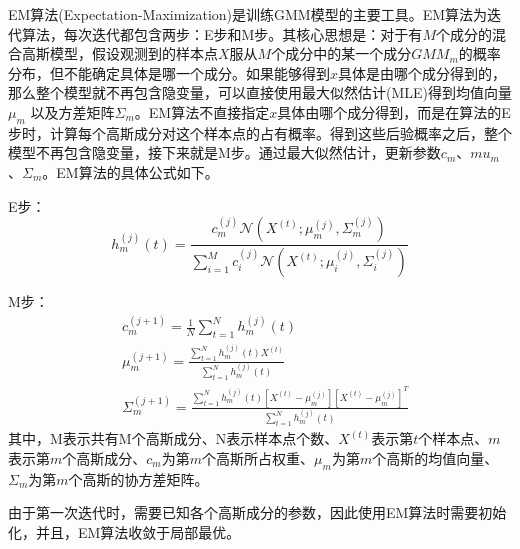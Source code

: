 EM算法(Expectation-Maximization)是训练GMM模型的主要工具。EM算法为迭代算法，每次迭代都包含两步：E步和M步。其核心思想是：对于有$M$个成分的混合高斯模型，假设观测到的样本点$X$服从$M$个成分中的某一个成分$GMM_m$的概率分布，但不能确定具体是哪一个成分。如果能够得到$x$具体是由哪个成分得到的，那么整个模型就不再包含隐变量，可以直接使用最大似然估计(MLE)得到均值向量$\mu_m$ 以及方差矩阵$\Sigma_m$。EM算法不直接指定$x$具体由哪个成分得到，而是在算法的E步时，计算每个高斯成分对这个样本点的占有概率。得到这些后验概率之后，整个模型不再包含隐变量，接下来就是M步。通过最大似然估计，更新参数$c_m$、$mu_m$、$\Sigma_m$。EM算法的具体公式如下。

E步：
\begin{equation}
  h_m^{(j)}(t) = \frac{c_m^{(j)}\mathcal{N}(X^{(t)};\mu_m^{(j)},\Sigma_m^{(j)})}{\sum_{i=1}^M c_i^{(j)}\mathcal{N}(X^{(t)};\mu_i^{(j)},\Sigma_i^{(j)})}
\end{equation}

M步：
\begin{eqnarray}
  &c_m^{(j+1)}=\frac{1}{N}\sum_{t=1}^N h_m^{(j)}(t) \\
  &\mu_m^{(j+1)}=\frac{\sum_{t=1}^{N} h_m^{(j)}(t)X^{(t)}}{\sum_{t=1}^{N} h_m^{(j)}(t)} \\
  &\Sigma_m^{(j+1)}=\frac{\sum_{t=1}^{N} h_m^{(j)}(t)[X^{(t)}-\mu_m^{(j)}][X^{(t)}-\mu_m^{(j)}]^T}{\sum_{t=1}^{N} h_m^{(j)}(t)}
\end{eqnarray}
其中，M表示共有M个高斯成分、N表示样本点个数、$X^{(t)}$表示第$t$个样本点、$m$表示第$m$个高斯成分、$c_m$为第$m$个高斯所占权重、$\mu_m$为第$m$个高斯的均值向量、$\Sigma_m$为第$m$个高斯的协方差矩阵。

由于第一次迭代时，需要已知各个高斯成分的参数，因此使用EM算法时需要初始化，并且，EM算法收敛于局部最优。

